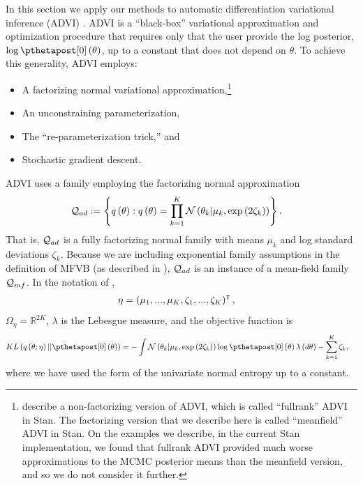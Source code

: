 \documentclass{article}\usepackage[]{graphicx}\usepackage[]{color}
\theoremstyle{definition}
\theoremstyle{plain}
\theoremstyle{plain}
\theoremstyle{plain}
\theoremstyle{definition}
\theoremstyle{plain}
\theoremstyle{plain}
\begin{document}
\newcommand{\adviNumVBSamples}{10}


In this section we apply our methods to automatic differentiation
variational inference (ADVI) \citep{kucukelbir:2017:advi}. ADVI is
a ``black-box'' variational approximation and optimization procedure
that requires only that the user provide the log posterior,
$\log \pzeropost\left(\theta\right)$, up to a constant that does
not depend on $\theta$. To achieve this generality,
ADVI employs:
\begin{itemize}
\item A factorizing normal variational approximation,\footnote{\citet{kucukelbir:2017:advi}
    describe a non-factorizing version of ADVI, which is called
    ``fullrank'' ADVI in Stan.  The factorizing version
    that we describe here is called ``meanfield'' ADVI in Stan.
    On the examples we describe, in the current Stan implementation,
    we found that fullrank ADVI provided much worse approximations to
    the MCMC posterior
    means than the meanfield version, and so we do not consider it further.}
\item An unconstraining parameterization,
\item The ``re-parameterization trick,'' and
\item Stochastic gradient descent.
\end{itemize}
ADVI uses a family employing the factorizing normal approximation
\begin{align*}
\mathcal{Q}_{ad} & :=\left\{ q\left(\theta\right):q\left(\theta\right) =
    \prod_{k=1}^{K}\mathcal{N}\left(\theta_{k}\vert\mu_{k},
        \exp\left(2\zeta_{k}\right)\right)\right\} .
\end{align*}
That is, $\mathcal{Q}_{ad}$ is a fully factorizing normal family with means
$\mu_{k}$ and log standard deviations $\zeta_{k}$. Because we are
including exponential family assumptions in the definition of MFVB
(as described in ), $\mathcal{Q}_{ad}$
is an instance of a mean-field family $\mathcal{Q}_{mf}$. In the notation of
,
\begin{align}
\eta & =\left(\mu_{1},...,\mu_{K},\zeta_{1},...,\zeta_{K}\right)^{\intercal},
\label{eq:advi_parameter_def}
\end{align}
 $\Omega_{\eta}=\mathbb{R}^{2K}$, $\lambda$ is the Lebesgue measure,
and the objective function  is
\begin{align*}
KL\left(q\left(\theta;\eta\right)||\pzeropost\left(\theta\right)\right) &
    =-\int\mathcal{N}\left(\theta_{k}\vert\mu_{k},
        \exp\left(2\zeta_{k}\right)\right)\log\pzeropost\left(\theta\right)
        \lambda\left(d\theta\right)-\sum_{k=1}^{K}\zeta_{k},
\end{align*}
where we have used the form of the univariate normal entropy up to a
constant.
\end{document}

